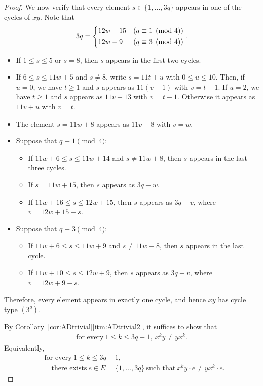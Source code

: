 \documentclass[12pt,reqno]{amsart}
\newcommand{\HL}{\vspace{2mm}}							%
\newcommand{\q}{\quad}									%
\theoremstyle{mythmstyle}
\theoremstyle{mydefstyle}
\newcommand{\corref}[1]{Corollary~\ref{#1}}
\numberwithin{equation}{section}
\begin{document}
\begin{proof}
We now verify that every element $s \in \{1, \ldots, 3q\}$ appears in one of the cycles of $xy$.
Note that
\begin{align}
3q =
\begin{dcases}
12w + 15 & (q \equiv 1 \pmod{4}) \\
12w + 9 & (q \equiv 3 \pmod{4})
\end{dcases}.
\end{align}
\begin{itemize}
\item If $1 \le s \le 5$ or $s = 8$, then $s$ appears in the first two cycles.
\item If $6 \le s \le 11w+5$ and $s \ne 8$, write $s = 11t+u$ with $0 \le u \le 10$.
Then, if $u = 0$, we have $t \ge 1$ and $s$ appears as $11(v+1)$ with $v = t-1$.
If $u = 2$, we have $t \ge 1$ and $s$ appears as $11v+13$ with $v = t-1$.
Otherwise it appears
as $11v+u$ with $v = t$.
\item The element $s = 11w+8$ appears as $11v+8$ with $v=w$.
\item Suppose that $q \equiv 1 \pmod{4}$:
\begin{itemize}
\item If $11w+6 \le s \le 11w+14$ and $s \ne 11w+8$, then $s$ appears in the last three cycles.
\item If $s = 11w+15$, then $s$ appears as $3q-w$.
\item If $11w+16 \le s \le 12w+15$, then $s$ appears as $3q - v$, where $v = 12w+15 - s$.
\end{itemize}
\item Suppose that $q \equiv 3 \pmod{4}$:
\begin{itemize}
\item If $11w+6 \le s \le 11w+9$ and $s \ne 11w+8$, then $s$ appears in the last cycle.
\item If $11w+10 \le s \le 12w+9$, then $s$ appears as $3q-v$, where $v = 12w+9 - s$.
\end{itemize}
\end{itemize}

Therefore, every element appears in exactly one cycle, and hence $xy$ has cycle type $(3^q)$.
\HL

\item[\ref{itm:c3b3-3}]
By \corref{cor:ADtrivial}\ref{itm:ADtrivial2}, it suffices to show that
\begin{align}
\text{for every}\ 1 \le k \le 3q-1, \ x^{k}y \ne yx^{k}.
\end{align}
Equivalently,
\begin{align}
&\text{for every}\ 1 \le k \le 3q-1,\\
\label{eq:3qxkytrivial}
&\q\text{there exists}\ e \in E = \{ 1, \ldots, 3q \}\ \text{such that}\ x^{k}y\cdot e \ne yx^{k}\cdot e.
\end{align}


\end{proof}
\end{document}
